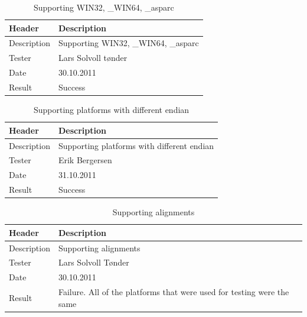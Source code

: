 \begin{table}[!htb] \footnotesize \center
\caption{Supporting WIN32, \_WIN64, \_\gls{asparc} \label{tab:sp3TID19}}
\begin{tabular}{l l}
	\toprule
	Header & Description \\
	\midrule
	Description & Supporting WIN32, \_WIN64, \_\gls{asparc} \\
	Tester & Lars Solvoll tønder\\
	Date & 30.10.2011\\
	Result & Success \\
	\bottomrule
\end{tabular}
\end{table}

\begin{table}[!htb] \footnotesize \center
\caption{Supporting the use of flags specifying platforms \label{tab:sp3TID20}}
\noindent{}
\end{table}

\begin{table}[!htb] \footnotesize \center
\caption{Supporting platforms with different \gls{endian} \label{tab:sp3TID21}}
\begin{tabular}{l l}
	\toprule
	Header & Description \\
	\midrule
	Description & Supporting platforms with different \gls{endian} \\
	Tester & Erik Bergersen\\
	Date & 31.10.2011\\
	Result & Success\\
	\bottomrule
\end{tabular}
\end{table}

\begin{table}[!htb] \footnotesize \center
\caption{Supporting alignments \label{tab:sp3TID22}}
\begin{tabular}{l l}
	\toprule
	Header & Description \\
	\midrule
	Description & Supporting alignments \\
	Tester & Lars Solvoll Tønder\\
	Date & 30.10.2011\\
	Result & Failure. All of the platforms that were used for testing were the same\\
	\bottomrule
\end{tabular}
\end{table}

